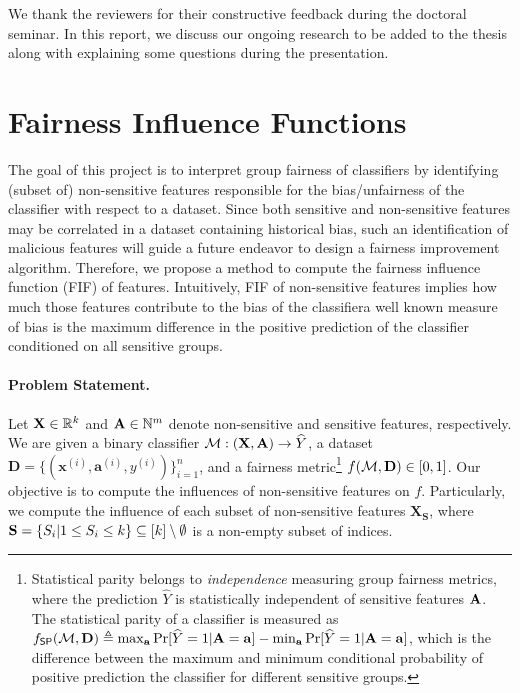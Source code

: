 \documentclass[10pt]{article}
\begin{document}
	We thank the reviewers for their constructive feedback during the doctoral seminar. In this report, we discuss our ongoing research to be added to the thesis along with explaining some questions during the presentation.
	
	
	\section*{Fairness Influence Functions}  The goal of this project is to interpret group fairness of classifiers by identifying (subset of) non-sensitive features responsible for the bias/unfairness of the classifier with respect to a dataset. Since both sensitive and non-sensitive features may be correlated in a dataset containing historical bias, such an identification of malicious features will guide a future endeavor to design a fairness improvement algorithm. Therefore, we propose a method to compute the fairness influence function (FIF) of features. Intuitively, FIF of non-sensitive features implies how much those features contribute to the bias of the classifier\textemdash a well known measure of bias is the maximum difference in the positive prediction of the classifier conditioned on all sensitive groups. 
	
	
	\paragraph{Problem Statement.} Let $ \mathbf{X} \in \mathbb{R}^k $ and $ \mathbf{A} \in \mathbb{N}^m $ denote non-sensitive and sensitive features, respectively. We are given a binary classifier  $\mathcal{M}: (\mathbf{X}, \mathbf{A}) \rightarrow \widehat{Y} $, a dataset $ \mathbf{D} = \{(\mathbf{x}^{(i)}, \mathbf{a}^{(i)}, y^{(i)})\}_{i=1}^n $, and a  fairness metric\footnote{Statistical parity belongs to \textit{independence} measuring group fairness metrics, where the prediction $ \widehat{Y} $ is statistically independent of sensitive features $ \mathbf{A} $.  The statistical parity of  a classifier is measured as $ f_{\mathsf{SP}}(\mathcal{M}, \mathbf{D}) \triangleq \max_{\mathbf{a}}\Pr[\widehat{Y} =1 | \mathbf{A} = \mathbf{a}] - \min_{\mathbf{a}}\Pr[\widehat{Y} =1 | \mathbf{A} = \mathbf{a}] $, which is the difference between the maximum and minimum conditional probability of positive prediction the classifier for different sensitive groups.} $ f(\mathcal{M}, \mathbf{D}) \in [0, 1] $.  Our objective is to compute the influences of non-sensitive features on $ f $. Particularly, we compute the influence of each subset of non-sensitive features $ \mathbf{X}_{\mathbf{S}} $, where $ \mathbf{S} = \{S_i | 1 \le S_i \le k\} \subseteq [k] \setminus \emptyset $ is a non-empty subset of indices. 
	
\end{document}
